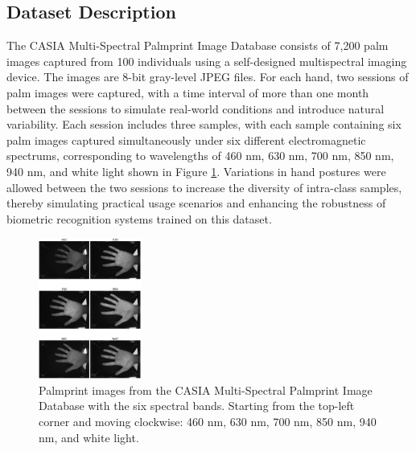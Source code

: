 \subsection{Dataset Description}

The CASIA Multi-Spectral Palmprint Image Database consists of 7,200 palm images captured from 100 individuals using a self-designed multispectral imaging device. The images are 8-bit gray-level JPEG files. For each hand, two sessions of palm images were captured, with a time interval of more than one month between the sessions to simulate real-world conditions and introduce natural variability. Each session includes three samples, with each sample containing six palm images captured simultaneously under six different electromagnetic spectrums, corresponding to wavelengths of 460 nm, 630 nm, 700 nm, 850 nm, 940 nm, and white light shown in Figure \ref{fig:dataset_example}. Variations in hand postures were allowed between the two sessions to increase the diversity of intra-class samples, thereby simulating practical usage scenarios and enhancing the robustness of biometric recognition systems trained on this dataset.

\begin{figure}[H]
    \centering
    \includegraphics[width=0.3\textwidth]{./images/spectrums.png}
    \caption{Palmprint images from the CASIA Multi-Spectral Palmprint Image Database with the six spectral bands. Starting from the top-left corner and moving clockwise: 460 nm, 630 nm, 700 nm, 850 nm, 940 nm, and white light.}
    \label{fig:dataset_example}
\end{figure}